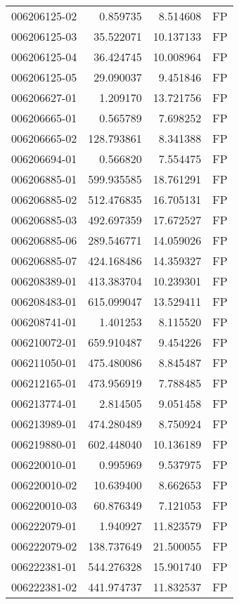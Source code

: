 \begin{tabular}{lrrl}
006206125-02 &    0.859735 &     8.514608 &   FP \\
006206125-03 &   35.522071 &    10.137133 &   FP \\
006206125-04 &   36.424745 &    10.008964 &   FP \\
006206125-05 &   29.090037 &     9.451846 &   FP \\
006206627-01 &    1.209170 &    13.721756 &   FP \\
006206665-01 &    0.565789 &     7.698252 &   FP \\
006206665-02 &  128.793861 &     8.341388 &   FP \\
006206694-01 &    0.566820 &     7.554475 &   FP \\
006206885-01 &  599.935585 &    18.761291 &   FP \\
006206885-02 &  512.476835 &    16.705131 &   FP \\
006206885-03 &  492.697359 &    17.672527 &   FP \\
006206885-06 &  289.546771 &    14.059026 &   FP \\
006206885-07 &  424.168486 &    14.359327 &   FP \\
006208389-01 &  413.383704 &    10.239301 &   FP \\
006208483-01 &  615.099047 &    13.529411 &   FP \\
006208741-01 &    1.401253 &     8.115520 &   FP \\
006210072-01 &  659.910487 &     9.454226 &   FP \\
006211050-01 &  475.480086 &     8.845487 &   FP \\
006212165-01 &  473.956919 &     7.788485 &   FP \\
006213774-01 &    2.814505 &     9.051458 &   FP \\
006213989-01 &  474.280489 &     8.750924 &   FP \\
006219880-01 &  602.448040 &    10.136189 &   FP \\
006220010-01 &    0.995969 &     9.537975 &   FP \\
006220010-02 &   10.639400 &     8.662653 &   FP \\
006220010-03 &   60.876349 &     7.121053 &   FP \\
006222079-01 &    1.940927 &    11.823579 &   FP \\
006222079-02 &  138.737649 &    21.500055 &   FP \\
006222381-01 &  544.276328 &    15.901740 &   FP \\
006222381-02 &  441.974737 &    11.832537 &   FP \\

\end{tabular}
